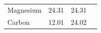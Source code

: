 \begin{enumerate}[noitemsep, label=\textbf{\arabic*}. ]
{\begin{tabular}[t]{|l|l|l|l|}
    
        Magnesium &
    
    
        24.31 &
    
    
        24.31 &
    
    
     \tabularnewline\cline{1-1}\cline{2-2}\cline{3-3}\cline{4-4}
    
    
        Carbon &
    
    
        12.01 &
    
    
        24.02 &
    
    
     \tabularnewline\cline{1-1}\cline{2-2}\cline{3-3}\cline{4-4}
    

\end{tabular}}
\end{enumerate}
